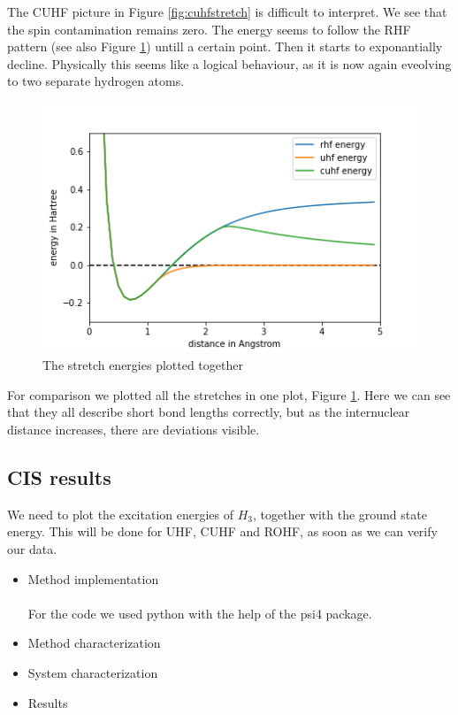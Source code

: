 \documentclass[twoside,twocolumn,9pt]{article}
\begin{document}
The CUHF picture in Figure \ref{fig:cuhfstretch} is difficult to interpret. We see that the spin contamination remains zero. The energy seems to follow the RHF pattern (see also Figure \ref{fig:combo}) untill a certain point. Then it starts to exponantially decline. Physically this seems like a logical behaviour, as it is now again eveolving to two separate hydrogen atoms. 
\begin{center}
\begin{figure}[h]
  \includegraphics[width=\linewidth]{./../notes/figures/combo.png}
  \caption{The stretch energies plotted together}
  \label{fig:combo}
\end{figure}
\end{center}
For comparison we plotted all the stretches in one plot, Figure \ref{fig:combo}. Here we can see that they all describe short bond lengths correctly, but as the internuclear distance increases, there are deviations visible.
\subsection{CIS results}
We need to plot the excitation energies of $H_3$, together with the ground state energy. This will be done for UHF, CUHF and ROHF, as soon as we can verify our data.
\begin{itemize}
    \item Method implementation
    \paragraph*{}
    For the code we used python with the help of the psi4 package.
    \item Method characterization
    \item System characterization
    \item Results
\end{itemize}
\end{document}
